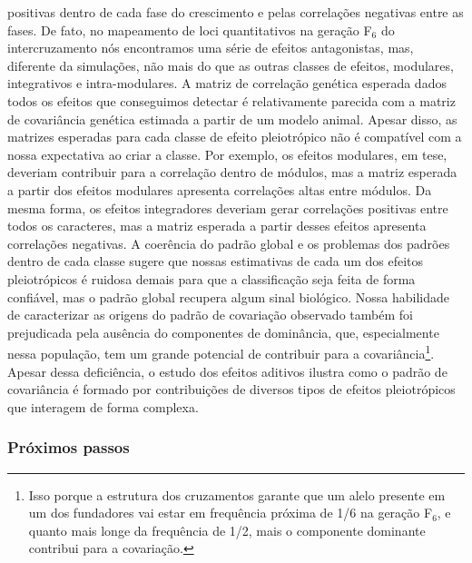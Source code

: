 \begin{refsection}
positivas dentro de cada fase do crescimento e pelas correlações negativas
entre as fases. De fato, no mapeamento de loci quantitativos na geração F$_6$
do intercruzamento nós encontramos uma série de efeitos antagonistas, mas,
diferente da simulações, não mais do que as outras classes de efeitos,
modulares, integrativos e intra-modulares. A matriz de correlação genética
esperada dados todos os efeitos que conseguimos detectar é relativamente
parecida com a matriz de covariância genética estimada a partir de um modelo
animal. Apesar disso, as matrizes esperadas para cada classe de efeito
pleiotrópico não é compatível com a nossa expectativa ao criar a classe. Por
exemplo, os efeitos modulares, em tese, deveriam contribuir para a correlação
dentro de módulos, mas a matriz esperada a partir dos efeitos modulares
apresenta correlações altas entre módulos. Da mesma forma, os efeitos
integradores deveriam gerar correlações positivas entre todos os caracteres,
mas a matriz esperada a partir desses efeitos apresenta correlações negativas.
A coerência do padrão global e os problemas dos padrões dentro de cada classe
sugere que nossas estimativas de cada um dos efeitos pleiotrópicos é ruidosa
demais para que a classificação seja feita de forma confiável, mas o padrão
global recupera algum sinal biológico. Nossa habilidade de caracterizar as
origens do padrão de covariação observado também foi prejudicada pela ausência
do componentes de dominância, que, especialmente nessa população, tem um
grande potencial de contribuir para a covariância\footnote{Isso porque a
estrutura dos cruzamentos garante que um alelo presente em um dos fundadores
vai estar em frequência próxima de 1/6 na geração F$_6$, e quanto mais longe
da frequência de 1/2, mais o componente dominante contribui para a
covariação.}. Apesar dessa deficiência, o estudo dos efeitos aditivos ilustra
como o padrão de covariância é formado por contribuições de diversos tipos de
efeitos pleiotrópicos que interagem de forma complexa.

\subsubsection{Próximos passos}


\end{refsection}
